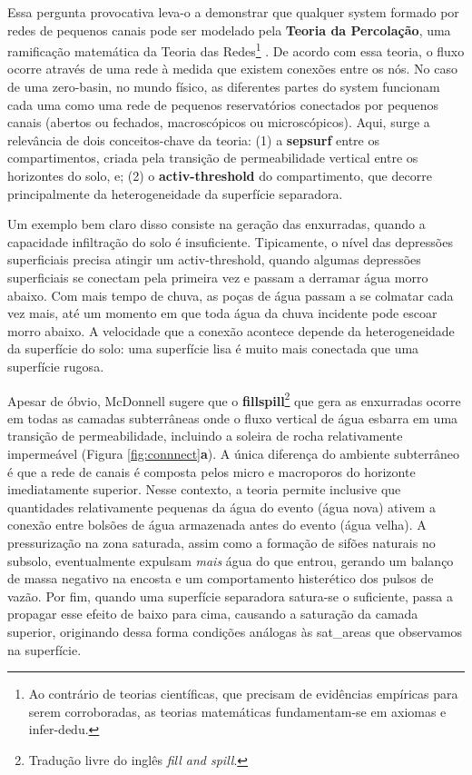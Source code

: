 \documentclass[./main.tex]{subfiles}
\begin{document}
Essa pergunta provocativa leva-o a demonstrar que qualquer \gls{system} formado por redes de pequenos canais pode ser modelado pela \textbf{Teoria da Percolação}, uma ramificação matemática da Teoria das Redes\footnote{Ao contrário de teorias científicas, que precisam de evidências empíricas para serem corroboradas, as teorias matemáticas fundamentam-se em axiomas e \gls{infer-dedu}.} \cite{Janzen2015a}. De acordo com essa \gls{teoria}, o fluxo ocorre através de uma rede à medida que existem conexões entre os nós. No caso de uma \gls{zero-basin}, no mundo físico, as diferentes partes do \gls{system} funcionam cada uma como uma rede de pequenos reservatórios conectados por pequenos canais (abertos ou fechados, macroscópicos ou microscópicos). Aqui, surge a relevância de dois conceitos-chave da \gls{teoria}: (1) a \textbf{\gls{sepsurf}} entre os compartimentos, criada pela transição de permeabilidade vertical entre os horizontes do solo, e; (2) o \textbf{\gls{activ-threshold}} do compartimento, que decorre principalmente da heterogeneidade da superfície separadora.

\par Um exemplo bem claro disso consiste na geração das enxurradas, quando a capacidade infiltração do solo é insuficiente. Tipicamente, o nível das depressões superficiais precisa atingir um \gls{activ-threshold}, quando algumas depressões superficiais se conectam pela primeira vez e passam a derramar água morro abaixo. Com mais tempo de chuva, as poças de água passam a se colmatar cada vez mais, até um momento em que toda água da chuva incidente pode escoar morro abaixo. A velocidade que a conexão acontece depende da heterogeneidade da superfície do solo: uma superfície lisa é muito mais conectada que uma superfície rugosa.

\par Apesar de óbvio, McDonnell sugere que o \textbf{\gls{fillspill}}\footnote{Tradução livre do inglês \textit{fill and spill}.} que gera as enxurradas ocorre em todas as camadas subterrâneas onde o fluxo vertical de água esbarra em uma transição de permeabilidade, incluindo a soleira de rocha relativamente impermeável (Figura \ref{fig:connnect}\textbf{a}). A única diferença do ambiente subterrâneo é que a rede de canais é composta pelos micro e macroporos do horizonte imediatamente superior. Nesse contexto, a \gls{teoria} permite inclusive que quantidades relativamente pequenas da água do evento (água nova) ativem a conexão entre bolsões de água armazenada antes do evento (água velha). A pressurização na zona saturada, assim como a formação de sifões naturais no subsolo, eventualmente expulsam \textit{mais} água do que entrou, gerando um balanço de massa negativo na encosta e um comportamento histerético dos pulsos de vazão. Por fim, quando uma superfície separadora satura-se o suficiente, passa a propagar esse efeito de baixo para cima, causando a saturação da camada superior, originando dessa forma condições análogas às \gls{sat_areas} que observamos na superfície.
\end{document}
